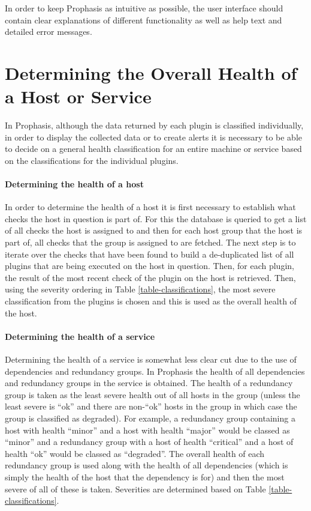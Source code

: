 \documentclass[bsc,deptreport,twoside,parskip,singlespacing,notimes]{infthesis}
\begin{document}
	In order to keep Prophasis as intuitive as possible, the user interface should
	contain clear explanations of different functionality as well as help text and
	detailed error messages.

\section{Determining the Overall Health of a Host or Service}

	In Prophasis, although the data returned by each plugin is classified individually,
	in order to display the collected data or to create alerts it is necessary to
	be able to decide on a general health classification for an entire machine or
	service based on the classifications for the individual plugins.

\paragraph*{Determining the health of a host}
	In order to determine the health of a host it is first necessary to establish what
	checks the host in question is part of. For this the database is queried to get
	a list of all checks the host is assigned to and then for each host group that
	the host is part of, all checks that the group is assigned to are fetched.  The next
	step is to iterate over the checks that have been found to build a de-duplicated list
	of all plugins that are being executed on the host in question. Then, for each
	plugin, the result of the most recent check of the plugin on the host is retrieved.
	Then, using the severity ordering in Table \ref{table-classifications}, the most
	severe classification from the plugins is chosen and this is used as the overall
	health of the host.

\paragraph*{Determining the health of a service}
	Determining the health of a service is somewhat less clear cut due to the use
	of dependencies and redundancy groups.  In Prophasis the health of all dependencies
	and redundancy groups in the service is obtained. The health of a redundancy group
	is taken as the least severe health out of all hosts in the group (unless the least
	severe is ``ok'' and there are non-``ok'' hosts in the group in
	which case the group is classified as degraded).  For example, a redundancy group
	containing a host with health ``minor'' and a host with health ``major'' would be
	classed as ``minor'' and a redundancy group with a host of health ``critical'' and
	a host of health ``ok'' would be classed as ``degraded''.  The overall
	health of each redundancy group is used along with the health of all dependencies
	(which is simply the health of the host that the dependency is for) and then
	the most severe of all of these is taken.  Severities are determined based on Table
	\ref{table-classifications}.
\end{document}
